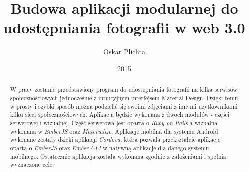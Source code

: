 \documentclass[brudnopis]{xmgr}
\author   {Oskar Plichta}
\title    {Budowa aplikacji modularnej do udostępniania fotografii  w web 3.0}
\date     {2015}
\begin{document}
\begin{abstract}
W pracy zostanie przedstawiony program do udostępniania fotografii na kilka serwisów społecznościowych jednocześnie z intuicyjnym interfejsem Material Design. Dzięki temu w prosty i szybki sposób można podzielić się swoimi zdjęciami z innymi użytkownikami kilku sieci społecznościowych. Aplikacja będzie wykonana z dwóch modułów - części serwerowej i wizualnej. Część serwerowa jest oparta o \textit{Ruby on Rails} a wizualna wykonana w \textit{EmberJS} oraz \textit{Materialize}. Aplikacje mobilna dla systemu Android wykonane zostały dzięki aplikacji \textit{Cordova}, która pozwala przekształcić aplikację opartą o \textit{EmberJS} oraz \textit{Ember CLI} w natywną aplikacje dla danego systemu mobilnego. Ostatecznie aplikacja została wykonana zgodnie z założeniami i spełnia wyznaczone cele.

\end{abstract}
\end{document}
